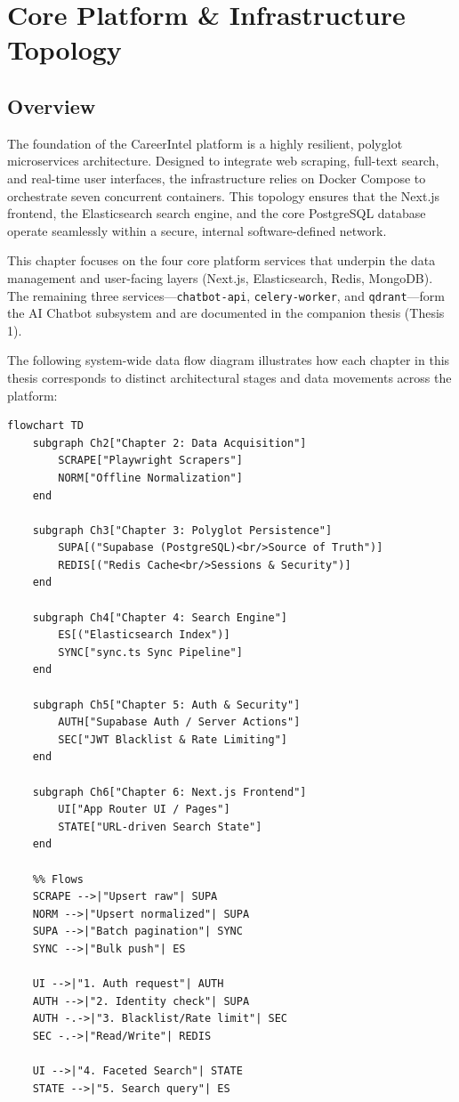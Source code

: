 \chapter{Core Platform \& Infrastructure Topology}

\section{Overview}
The foundation of the CareerIntel platform is a highly resilient, polyglot microservices architecture. Designed to integrate web scraping, full-text search, and real-time user interfaces, the infrastructure relies on Docker Compose to orchestrate seven concurrent containers. This topology ensures that the Next.js frontend, the Elasticsearch search engine, and the core PostgreSQL database operate seamlessly within a secure, internal software-defined network.

This chapter focuses on the four core platform services that underpin the data management and user-facing layers (Next.js, Elasticsearch, Redis, MongoDB). The remaining three services—\texttt{chatbot-api}, \texttt{celery-worker}, and \texttt{qdrant}—form the AI Chatbot subsystem and are documented in the companion thesis (Thesis 1).

The following system-wide data flow diagram illustrates how each chapter in this thesis corresponds to distinct architectural stages and data movements across the platform:

\begin{verbatim}
flowchart TD
    subgraph Ch2["Chapter 2: Data Acquisition"]
        SCRAPE["Playwright Scrapers"]
        NORM["Offline Normalization"]
    end

    subgraph Ch3["Chapter 3: Polyglot Persistence"]
        SUPA[("Supabase (PostgreSQL)<br/>Source of Truth")]
        REDIS[("Redis Cache<br/>Sessions & Security")]
    end

    subgraph Ch4["Chapter 4: Search Engine"]
        ES[("Elasticsearch Index")]
        SYNC["sync.ts Sync Pipeline"]
    end

    subgraph Ch5["Chapter 5: Auth & Security"]
        AUTH["Supabase Auth / Server Actions"]
        SEC["JWT Blacklist & Rate Limiting"]
    end

    subgraph Ch6["Chapter 6: Next.js Frontend"]
        UI["App Router UI / Pages"]
        STATE["URL-driven Search State"]
    end

    %% Flows
    SCRAPE -->|"Upsert raw"| SUPA
    NORM -->|"Upsert normalized"| SUPA
    SUPA -->|"Batch pagination"| SYNC
    SYNC -->|"Bulk push"| ES
    
    UI -->|"1. Auth request"| AUTH
    AUTH -->|"2. Identity check"| SUPA
    AUTH -.->|"3. Blacklist/Rate limit"| SEC
    SEC -.->|"Read/Write"| REDIS
    
    UI -->|"4. Faceted Search"| STATE
    STATE -->|"5. Search query"| ES
\end{verbatim}

